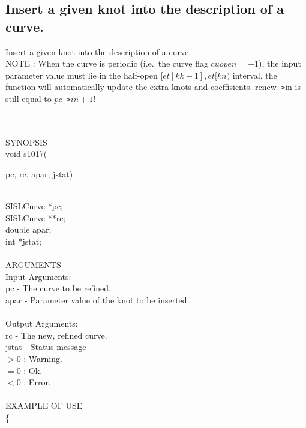 \subsection{Insert a given knot into the description of a curve.}
\begin{minipg1}
  Insert a given knot into the description of a curve.\\
  NOTE       : When the curve is periodic (i.e.\ the curve flag
  $cuopen=-1$), the input parameter value must lie in the half-open
  $[et[kk-1], et[kn)$ interval, the function will automatically update
  the extra knots and  coeffisients. {\fov rcnew}{\tt ->}{\fov in} is
  still equal to  $pc${\tt ->}$in + 1$!
\end{minipg1} \\ \\
SYNOPSIS\\
        \>void s1017(\begin{minipg3}
          {\fov pc},  {\fov rc},  {\fov apar},  {\fov jstat})
        \end{minipg3}\\[0.3ex]
        \>\>    SISLCurve \> *{\fov pc};\\
        \>\>    SISLCurve \> **{\fov rc};\\
        \>\>    double    \> {\fov apar};\\
        \>\>    int       \> *{\fov jstat};\\
\\
ARGUMENTS\\
        \>Input Arguments:\\
        \>\>    {\fov pc}   \> - \> The curve to be refined.\\
        \>\>    {\fov apar} \> - \> Parameter value of the knot to be inserted.\\
\\
        \>Output Arguments:\\
        \>\>    {\fov rc}    \> - \> The new, refined curve.\\
        \>\>    {\fov jstat} \> - \> Status message\\
                      \>\>\>\>\> $> 0$ : Warning.\\
                      \>\>\>\>\> $= 0$ : Ok.\\
                      \>\>\>\>\> $< 0$ : Error.\\
\\
EXAMPLE OF USE\\
        \>      \{ \\
